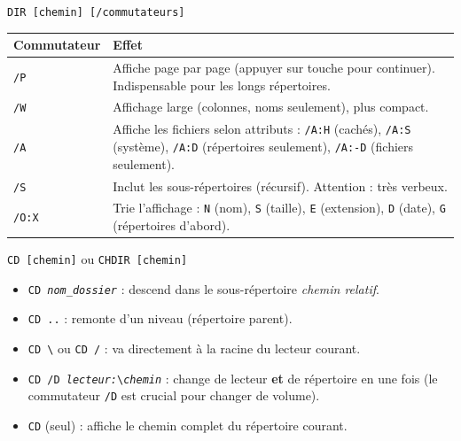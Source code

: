 \documentclass[11pt]{article}
\begin{document}
\begin{propriete}
\texttt{DIR [chemin] [/commutateurs]}
\begin{center}
\begin{tabularx}{\linewidth}{|l|X|}\hline
\textbf{Commutateur} & \textbf{Effet} \\\hline
\texttt{/P} & Affiche page par page (appuyer sur touche pour continuer). Indispensable pour les longs répertoires. \\\hline
\texttt{/W} & Affichage large (colonnes, noms seulement), plus compact. \\\hline
\texttt{/A} & Affiche les fichiers selon attributs : \texttt{/A:H} (cachés), \texttt{/A:S} (système), \texttt{/A:D} (répertoires seulement), \texttt{/A:-D} (fichiers seulement). \\\hline
\texttt{/S} & Inclut les sous-répertoires (récursif). Attention : très verbeux. \\\hline
\texttt{/O:X} & Trie l'affichage : \texttt{N} (nom), \texttt{S} (taille), \texttt{E} (extension), \texttt{D} (date), \texttt{G} (répertoires d'abord). \\\hline
\end{tabularx}
\end{center}
\end{propriete}

\begin{propriete}
\texttt{CD [chemin]} ou \texttt{CHDIR [chemin]}
\begin{itemize}
    \item \texttt{CD \emph{nom\_dossier}} : descend dans le sous-répertoire \emph{chemin relatif}.
    \item \texttt{CD ..} : remonte d'un niveau (répertoire parent).
    \item \texttt{CD \textbackslash} ou \texttt{CD /} : va directement à la racine du lecteur courant.
    \item \texttt{CD /D \emph{lecteur:}\textbackslash\emph{chemin}} : change de lecteur \textbf{et} de répertoire en une fois (le commutateur \texttt{/D} est crucial pour changer de volume).
    \item \texttt{CD} (seul) : affiche le chemin complet du répertoire courant.
\end{itemize}
\end{propriete}
\end{document}
